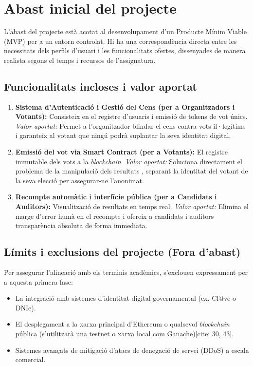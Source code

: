 \documentclass[12pt,a4paper]{article}
\begin{document}
\section{Abast inicial del projecte}

L'abast del projecte està acotat al desenvolupament d'un Producte Mínim Viable (MVP) per a un entorn controlat. Hi ha una correspondència directa entre les necessitats dels perfils d'usuari i les funcionalitats ofertes, dissenyades de manera realista segons el temps i recursos de l'assignatura.

\subsection{Funcionalitats incloses i valor aportat}
\begin{enumerate}
    \item \textbf{Sistema d'Autenticació i Gestió del Cens (per a Organitzadors i Votants):} Consisteix en el registre d'usuaris i emissió de tokens de vot únics. \textit{Valor aportat:} Permet a l'organitzador blindar el cens contra vots il·legítims i garanteix al votant que ningú podrà suplantar la seva identitat digital.
    \item \textbf{Emissió del vot via Smart Contract (per a Votants):} El registre immutable dels vots a la \textit{blockchain}. \textit{Valor aportat:} Soluciona directament el problema de la manipulació dels resultats , separant la identitat del votant de la seva elecció  per assegurar-ne l'anonimat.
    \item \textbf{Recompte automàtic i interfície pública (per a Candidats i Auditors):} Visualització de resultats en temps real. \textit{Valor aportat:} Elimina el marge d'error humà en el recompte  i ofereix a candidats i auditors transparència absoluta de forma immediata.
\end{enumerate}

\subsection{Límits i exclusions del projecte (Fora d'abast)}
Per assegurar l'alineació amb els terminis acadèmics, s'exclouen expressament per a aquesta primera fase:
\begin{itemize}
    \item La integració amb sistemes d'identitat digital governamental (ex. Cl@ve o DNIe).
    \item El desplegament a la xarxa principal d'Ethereum o qualsevol \textit{blockchain} pública (s'utilitzarà una testnet o xarxa local com Ganache)[cite: 30, 43].
    \item Sistemes avançats de mitigació d'atacs de denegació de servei (DDoS) a escala comercial.
\end{itemize}
\end{document}
